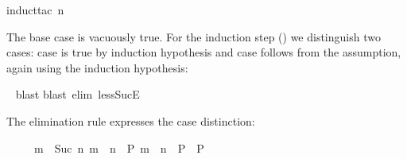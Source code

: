 \begin{isabellebody}
%
\isadelimproof
%
\endisadelimproof
%
\isatagproof
{}\isamarkupfalse%
{}induct{}tac\ n{}%
\begin{isamarkuptxt}%
\noindent
The base case is vacuously true. For the induction step () we distinguish two cases: case  is true by induction
hypothesis and case  follows from the assumption, again using
the induction hypothesis:%
\end{isamarkuptxt}%
\isamarkuptrue%
\ \isamarkupfalse%
{}blast{}\isanewline
{}\isamarkupfalse%
{}blast\ elim{}\ less{}SucE{}%
\endisatagproof
{\isafoldproof}%
%
\isadelimproof
%
\endisadelimproof
%
\begin{isamarkuptext}%
\noindent
The elimination rule  expresses the case distinction:
\begin{isabelle}%
\ \ \ \ \ {}m\ {}\ Suc\ n{}\ m\ {}\ n\ {}\ P{}\ m\ {}\ n\ {}\ P{}\ {}\ P%
\end{isabelle}


\end{isamarkuptext}
\end{isabellebody}
